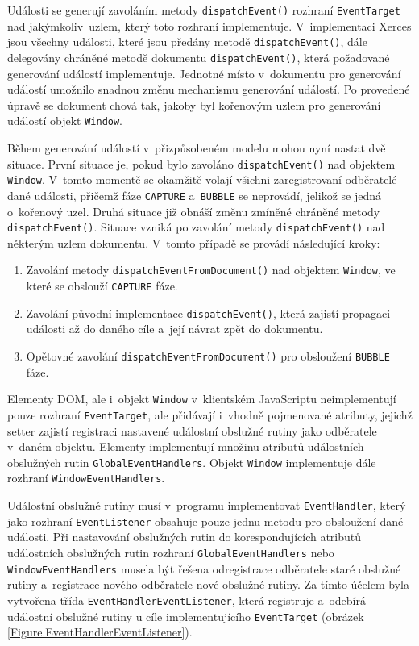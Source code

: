 Události se generují zavoláním metody \texttt{dispatchEvent()} rozhraní \texttt{EventTarget} nad jakýmkoliv~uzlem, který toto rozhraní implementuje. V~implementaci Xerces jsou všechny události, které jsou předány metodě \texttt{dispatchEvent()}, dále delegovány chráněné metodě dokumentu \texttt{dispatchEvent()}, která požadované generování událostí implementuje. Jednotné místo v~dokumentu pro generování událostí umožnilo snadnou změnu mechanismu generování událostí. Po provedené úpravě se dokument chová tak, jakoby byl kořenovým uzlem pro generování událostí objekt \texttt{Window}.

Během generování událostí v~přizpůsobeném modelu mohou nyní nastat dvě situace. První situace je, pokud bylo zavoláno \texttt{dispatchEvent()} nad objektem \texttt{Window}. V~tomto momentě se okamžitě volají všichni zaregistrovaní odběratelé dané události, přičemž fáze \texttt{CAPTURE} a~\texttt{BUBBLE} se neprovádí, jelikož se jedná o~kořenový uzel. Druhá situace již obnáší změnu zmíněné chráněné metody \texttt{dispatchEvent()}. Situace vzniká po zavolání metody \texttt{dispatchEvent()} nad některým uzlem dokumentu. V~tomto případě se provádí následující kroky:

\begin{enumerate}
  \item Zavolání metody \texttt{dispatchEventFromDocument()} nad objektem \texttt{Window}, ve které se obslouží \texttt{CAPTURE} fáze. 
  \item Zavolání původní implementace \texttt{dispatchEvent()}, která zajistí propagaci události až do daného cíle a~její návrat zpět do dokumentu. 
  \item Opětovné zavolání \texttt{dispatchEventFromDocument()} pro obsloužení \texttt{BUBBLE} fáze.
\end{enumerate}

Elementy DOM, ale i~objekt \texttt{Window} v~klientském JavaScriptu neimplementují pouze rozhraní \texttt{EventTarget}, ale přidávají i~vhodně pojmenované atributy, jejichž setter zajistí registraci nastavené událostní obslužné rutiny jako odběratele v~daném objektu. Elementy implementují množinu atributů událostních obslužných rutin \texttt{GlobalEventHandlers}. Objekt \texttt{Window} implementuje dále rozhraní \texttt{WindowEventHandlers}.

Událostní obslužné rutiny musí v~programu implementovat \texttt{EventHandler}, který jako rozhraní \texttt{EventListener} obsahuje pouze jednu metodu pro obsloužení dané události. Při nastavování obslužných rutin do korespondujících atributů událostních obslužných rutin rozhraní \texttt{GlobalEventHandlers} nebo \texttt{WindowEventHandlers} musela být řešena odregistrace odběratele staré obslužné rutiny a~registrace nového odběratele nové obslužné rutiny. Za tímto účelem byla vytvořena třída \texttt{EventHandlerEventListener}, která registruje a~odebírá událostní obslužné rutiny u cíle implementujícího \texttt{EventTarget} (obrázek \ref{Figure.EventHandlerEventListener}).

